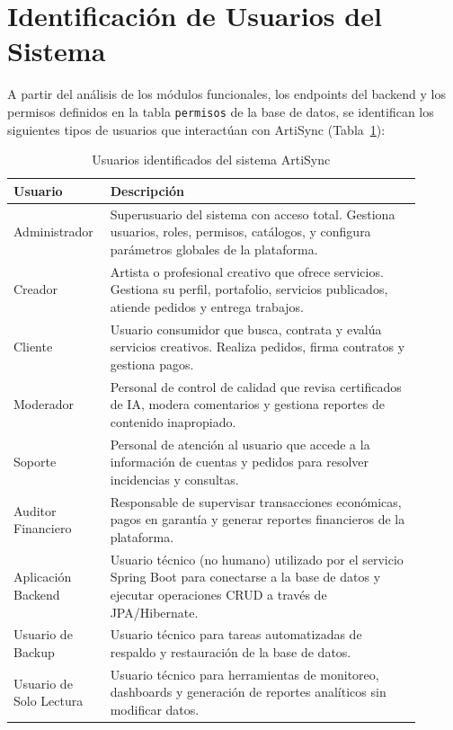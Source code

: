 \documentclass[conference, onecolumn]{IEEEtran}
\begin{document}
\section{Identificación de Usuarios del Sistema}

A partir del análisis de los módulos funcionales, los endpoints del backend y los permisos definidos en la tabla \texttt{permisos} de la base de datos, se identifican los siguientes tipos de usuarios que interactúan con ArtiSync (Tabla~\ref{tab:usuarios}):

\begin{table}[H]
\centering
\caption{Usuarios identificados del sistema ArtiSync}
\label{tab:usuarios}
\scriptsize
\begin{tabular}{>{\raggedright\arraybackslash}p{0.18\linewidth} >{\raggedright\arraybackslash}p{0.72\linewidth}}
\toprule
\textbf{Usuario} & \textbf{Descripción} \\
\midrule
Administrador & Superusuario del sistema con acceso total. Gestiona usuarios, roles, permisos, catálogos, y configura parámetros globales de la plataforma. \\
\midrule
Creador & Artista o profesional creativo que ofrece servicios. Gestiona su perfil, portafolio, servicios publicados, atiende pedidos y entrega trabajos. \\
\midrule
Cliente & Usuario consumidor que busca, contrata y evalúa servicios creativos. Realiza pedidos, firma contratos y gestiona pagos. \\
\midrule
Moderador & Personal de control de calidad que revisa certificados de IA, modera comentarios y gestiona reportes de contenido inapropiado. \\
\midrule
Soporte & Personal de atención al usuario que accede a la información de cuentas y pedidos para resolver incidencias y consultas. \\
\midrule
Auditor Financiero & Responsable de supervisar transacciones económicas, pagos en garantía y generar reportes financieros de la plataforma. \\
\midrule
Aplicación Backend & Usuario técnico (no humano) utilizado por el servicio Spring Boot para conectarse a la base de datos y ejecutar operaciones CRUD a través de JPA/Hibernate. \\
\midrule
Usuario de Backup & Usuario técnico para tareas automatizadas de respaldo y restauración de la base de datos. \\
\midrule
Usuario de Solo Lectura & Usuario técnico para herramientas de monitoreo, dashboards y generación de reportes analíticos sin modificar datos. \\
\bottomrule
\end{tabular}
\end{table}
\end{document}
